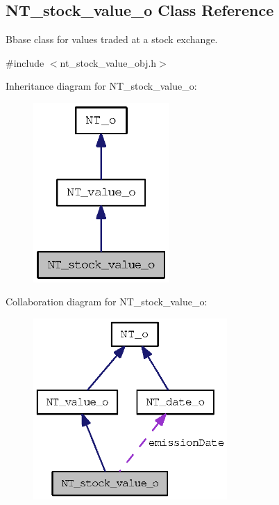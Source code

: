 \subsection{NT\_\-stock\_\-value\_\-o Class Reference}
\label{class_n_t__stock__value__o}


Bbase class for values traded at a stock exchange.  




{\ttfamily \#include $<$nt\_\-stock\_\-value\_\-obj.h$>$}



Inheritance diagram for NT\_\-stock\_\-value\_\-o:
\nopagebreak
\begin{figure}[H]
\begin{center}
\leavevmode
\includegraphics[width=146pt]{class_n_t__stock__value__o__inherit__graph}
\end{center}
\end{figure}


Collaboration diagram for NT\_\-stock\_\-value\_\-o:
\nopagebreak
\begin{figure}[H]
\begin{center}
\leavevmode
\includegraphics[width=209pt]{class_n_t__stock__value__o__coll__graph}
\end{center}
\end{figure}
